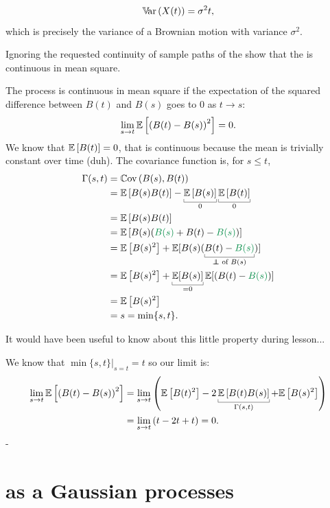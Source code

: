 \documentclass[12pt]{report}
\begin{document}
\[
\mathbb{V}\!\mathrm{ar}\,(X(t)) = \sigma^2 t,
\]
which is precisely the variance of a Brownian motion with variance \(\sigma^2\).
\begin{exercise}
	Ignoring the requested continuity of sample paths of the \bwm{} show that the \bwm{} is continuous in mean square.
\end{exercise}
The process is continuous in mean square if the expectation of the squared difference between $B(t)$ and $B(s)$ goes to 0 as $t\to s$:
\begin{equation*}
	\lim_{s\to t}\mathbb{E}\left[\left(B(t)-B(s)\right)^{2}\right]=0.
\end{equation*}
We know that $\mathbb{E}\left[B(t)\right]=0$, that is continuous because the mean is trivially constant over time (duh). The covariance function is, for $s\leq t$,
\begin{align*}
	\Gamma(s,t)&=\cov(B(s),B(t))\\
	&=\ev{B(s)B(t)}-\ubracketthin{\ev{B(s)}}_{0}\ubracketthin{\ev{B(t)}}_{0}\\
	&=\ev{B(s)B(t)}\\
	&=\ev{B(s)(\mathcolor{SpringGreen4}{B(s)}+B(t)-\mathcolor{SpringGreen4}{B(s)})}\\
	&=\ev{B(s)^{2}}+\evs[B(s)(\ubracketthin{B(t)-\mathcolor{SpringGreen4}{B(s)}}_{\claptext{$\independent$ of $B(s)$}})]\\
	&=\ev{B(s)^{2}}+\ubracketthin{\evs[B(s)]}_{=0}\evs[(B(t)-\mathcolor{SpringGreen4}{B(s)})]\\
	&=\ev{B(s)^{2}}\\
	&=s=\min\{s,t\}.
\end{align*}
\begin{insult}
	It would have been useful to know about this little property during lesson...
\end{insult}
We know that $\min\{s,t\}\big|_{s=t}=t$ so our limit is:
\begin{align*}
	\lim_{s\to t}\ev{\left(B(t)-B(s)\right)^{2}}&=\lim_{s\to t}\left(\ev{B(t)^{2}}-2\ubracketthin{\ev{B(t)B(s)}}_{\Gamma(s,t)}+\ev{B(s)^{2}}\right)\\
	&=\lim_{s\to t}\left(t-2t+t\right)=0.
\end{align*}
-
\section{\bwm{} as a Gaussian processes}
\end{document}

